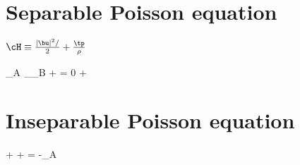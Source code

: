 \documentclass[12pt]{article}
\begin{document}
\section{Separable Poisson equation}

$\cH \equiv \frac{|\bu|^2/}{2} + \frac{\tp}{\rho}$


\be
    {\bF_{\rm A}}  _{\bF_{\rm B}} + \nabla \cH =  0 \label{momeq}
\ee
\be
    + \nabla \bigg[\frac{|\bu|^2/}{2}]
\ee

\section{Inseparable Poisson equation}

\be
    +  + \nabla{} = -\bF_{\rm A}
\ee
\end{document}
